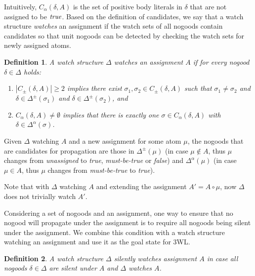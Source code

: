 \documentclass[final]{vutinfth} %
\newtheorem{definition}{Definition}[chapter]
\newcommand{\mbt}{must-be-true\xspace}
\newcommand{\ass}{A}
\newcommand{\cdpm}{C_\pm}
\newcommand{\cdal}{C_\alpha}
\newcommand{\dpm}{\Delta^\pm}
\newcommand{\dal}{\Delta^\alpha}
\newcommand{\lowinv}{watches\xspace}
\newcommand{\sgl}{\mu}
\newcommand{\bsgl}{\sigma}
\begin{document}
Intuitively, $C_\alpha(\delta, A)$ is the set of positive body literals in $\delta$ that are not assigned to be $\emph{true}$. Based on the definition of candidates, we say that a watch structure \emph{watches} an assignment if the watch sets of all nogoods contain candidates so that unit nogoods can be detected by checking the watch sets for newly assigned atoms.

\begin{definition}
A watch structure $\Delta$ \emph{\lowinv} an assignment $\ass$ if for every nogood $\delta \in \Delta$ holds:

\begin{enumerate}
\item $|\cdpm(\delta, A)| \geq 2$ implies there exist $\bsgl_1, \bsgl_2 \in \cdpm(\delta, A)$ such that $\bsgl_1 \not = \bsgl_2$ and $\delta \in \dpm(\bsgl_1)$ and $\delta \in \dpm(\bsgl_2)$, and
\item $\cdal(\delta, A) \not = \emptyset$ implies that there is exactly one $\bsgl \in \cdal(\delta, A)$ with $\delta \in \dal(\bsgl)$.
\end{enumerate}
\end{definition}

Given $\Delta$ watching $\ass$ and a new assignment for some atom $\sgl$, the nogoods that are candidates for propagation are those in $\dpm(\sgl)$ (in case $\sgl \not \in A$, thus $\sgl$ changes from \emph{unassigned} to \emph{true}, \emph{\mbt} or \emph{false}) and $\dal(\sgl)$ (in case $\sgl \in A$, thus $\sgl$ changes from \emph{\mbt} to \emph{true}).

Note that with $\Delta$ watching $\ass$ and extending the assignment $\ass' = \ass \circ \sgl$, now $\Delta$ does not trivially watch $\ass'$.

Considering a set of nogoods and an assignment, one way to ensure that no nogood will propagate under the assignment is to require all nogoods being silent under the assignment. We combine this condition with a watch structure watching an assignment and use it as the goal state for 3WL.

\begin{definition}
A watch structure $\Delta$ \emph{silently watches} assignment $\ass$ in case all nogoods $\delta \in \Delta$ are silent under $\ass$ and $\Delta$ watches $\ass$.
\end{definition}
\end{document}
